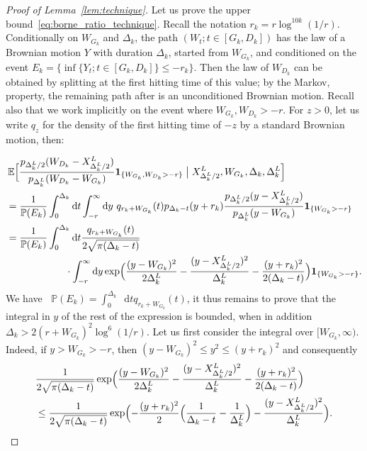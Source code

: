 \documentclass[british, a4paper,11pt]{article}
\numberwithin{equation}{section}
\theoremstyle{definition}
\renewcommand{\P}{\mathop{}\!\mathbb{P}}
\newcommand{\E}{\mathop{}\!\mathbb{E}}
\renewcommand{\d}{\mathop{}\!\mathrm{d}}
\newcommand{\ind}[1]{\mathbf{1}_{\{#1\}}}
\begin{document}
\begin{proof}[Proof of Lemma~\ref{lem:technique}]
Let us prove the upper bound~\eqref{eq:borne_ratio_technique}. Recall the notation $r_{k}=r \log^{10k}(1/r)$.
Conditionally on $W_{G_k}$ and $\Delta_k$, the path $(W_t; t \in [G_k, D_k])$ has the law of a Brownian motion $Y$ with duration $\Delta_k$, started from $W_{G_k}$, and conditioned on the event $E_k = \{\inf\{Y_t ; t \in [G_k, D_k]\} \leq -r_{k}\}$. Then the law of $W_{D_k}$ can be obtained by splitting at the first hitting time of this value; by the Markov, property, the remaining path after is an unconditioned Brownian motion. Recall also that we work implicitly on the event where $W_{G_k}, W_{D_k} > -r$. 
For $z>0$, let us write $q_z$ for the density of the first hitting time of $-z$ by a standard Brownian motion, 
then:




\begin{align*}
&\E\Bigl[\frac{p_{\Delta^L_k/2}(W_{D_k}-X^L_{\Delta^L_k/2})}{p_{\Delta^L_k}(W_{D_k}-W_{G_k})} \ind{W_{G_k}, W_{D_k}>-r} \bigm| X^L_{\Delta^L_k/2}, W_{G_k}, \Delta_k, \Delta^L_k\Bigr]
\\
&= \frac{1}{\P(E_k)} \int_0^{\Delta_k} \d t \int_{-r}^\infty \d y\ q_{r_{k}+W_{G_k}}(t) p_{\Delta_k-t}(y+r_{k})  \frac{p_{\Delta^L_k/2}(y-X^L_{\Delta^L_k/2})}{p_{\Delta^L_k}(y-W_{G_k})} \ind{W_{G_k}>-r}
\\
&= \frac{1}{\P(E_k)} \int_0^{\Delta_k} \d t \frac{q_{r_{k}+W_{G_k}}(t)}{2\sqrt{\pi(\Delta_k-t)}}  \\
& \qquad  \qquad \qquad \cdot \int_{-r}^\infty \d y \exp\Bigl(\frac{(y-W_{G_k})^2}{2\Delta^L_k} - \frac{(y-X^L_{\Delta^L_k/2})^2}{\Delta^L_k} - \frac{(y+r_{k})^2}{2(\Delta_k-t)}\Bigr) \ind{W_{G_k}>-r}
.\end{align*}
We have $\P(E_k) = \int_0^{\Delta_k} \d t q_{r_{k}+W_{G_k}}(t)$, it thus remains to prove that the integral in $y$ of the rest of the expression is bounded, when in addition $\Delta_k > 2(r+W_{G_k})^2 \log^6(1/r)$.
Let us first consider the integral over $[W_{G_k}, \infty)$. Indeed, if $y > W_{G_k} > -r$, then $(y-W_{G_k})^2 \leq y^2 \leq (y+r_{k})^2$ and consequently
\begin{align*}
&\frac{1}{2\sqrt{\pi(\Delta_k-t)}} \exp\Bigl(\frac{(y-W_{G_k})^2}{2\Delta^L_k} - \frac{(y-X^L_{\Delta^L_k/2})^2}{\Delta^L_k} - \frac{(y+r_{k})^2}{2(\Delta_k-t)}\Bigr)
\\
&\leq \frac{1}{2\sqrt{\pi(\Delta_k-t)}} \exp\Bigl(- \frac{(y+r_{k})^2}{2} \Bigl(\frac{1}{\Delta_k-t}-\frac{1}{\Delta^L_k}\Bigr) - \frac{(y-X^L_{\Delta^L_k/2})^2}{\Delta^L_k}\Bigr)
.\end{align*}

\end{proof}
\end{document}
